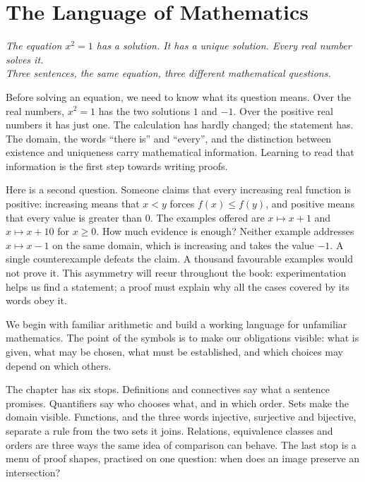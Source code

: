 \chapter{The Language of Mathematics}\label{ch:language}

\begin{center}\itshape
The equation $x^2=1$ has a solution. It has a unique solution. Every real number solves it.\\
Three sentences, the same equation, three different mathematical questions.
\end{center}

Before solving an equation, we need to know what its question means. Over the real numbers,
$x^2=1$ has the two solutions $1$ and $-1$. Over the positive real numbers it has just one.
The calculation has hardly changed; the statement has. The domain, the words ``there is''
and ``every'', and the distinction between existence and uniqueness carry mathematical information.
Learning to read that information is the first step towards writing proofs.

Here is a second question. Someone claims that every increasing real function is positive:
increasing means that $x<y$ forces $f(x)\le f(y)$, and positive means that every value is
greater than $0$. The examples offered are $x\mapsto x+1$ and $x\mapsto x+10$ for $x\ge0$.
How much evidence is enough? Neither example addresses $x\mapsto x-1$ on the same domain,
which is increasing and takes the value $-1$. A single counterexample defeats the claim.
A thousand favourable examples would not prove it.
This asymmetry will recur throughout the book: experimentation helps us find a statement;
a proof must explain why all the cases covered by its words obey it.

We begin with familiar arithmetic and build a working language for unfamiliar mathematics.
The point of the symbols is to make our obligations visible: what is given, what may be
chosen, what must be established, and which choices may depend on which others.

The chapter has six stops. Definitions and connectives say what a sentence promises.
Quantifiers say who chooses what, and in which order. Sets make the domain visible.
Functions, and the three words injective, surjective and bijective, separate a rule
from the two sets it joins. Relations, equivalence classes and orders are three ways
the same idea of comparison can behave. The last stop is a menu of proof shapes,
practised on one question: when does an image preserve an intersection?

